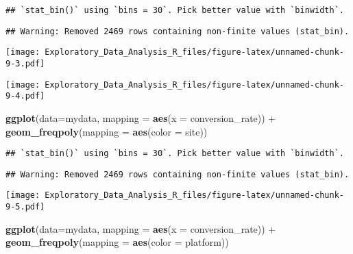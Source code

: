 \documentclass[]{article}
\newenvironment{Shaded}{\begin{snugshade}}{\end{snugshade}}
\newcommand{\KeywordTok}[1]{\textcolor[rgb]{0.13,0.29,0.53}{\textbf{{#1}}}}
\newcommand{\DataTypeTok}[1]{\textcolor[rgb]{0.13,0.29,0.53}{{#1}}}
\newcommand{\StringTok}[1]{\textcolor[rgb]{0.31,0.60,0.02}{{#1}}}
\newcommand{\OtherTok}[1]{\textcolor[rgb]{0.56,0.35,0.01}{{#1}}}
\newcommand{\NormalTok}[1]{{#1}}
\begin{document}
\begin{verbatim}
## `stat_bin()` using `bins = 30`. Pick better value with `binwidth`.
\end{verbatim}

\begin{verbatim}
## Warning: Removed 2469 rows containing non-finite values (stat_bin).
\end{verbatim}

\texttt{[image: Exploratory\_Data\_Analysis\_R\_files/figure-latex/unnamed-chunk-9-3.pdf]}

\begin{Shaded}
\end{Shaded}

\texttt{[image: Exploratory\_Data\_Analysis\_R\_files/figure-latex/unnamed-chunk-9-4.pdf]}

\begin{Shaded}
\begin{Highlighting}[]
\KeywordTok{ggplot}\NormalTok{(}\DataTypeTok{data=}\NormalTok{mydata, }\DataTypeTok{mapping =} \KeywordTok{aes}\NormalTok{(}\DataTypeTok{x =} \NormalTok{conversion_rate)) +}
\StringTok{  }\KeywordTok{geom_freqpoly}\NormalTok{(}\DataTypeTok{mapping =} \KeywordTok{aes}\NormalTok{(}\DataTypeTok{color =} \NormalTok{site))}
\end{Highlighting}
\end{Shaded}

\begin{verbatim}
## `stat_bin()` using `bins = 30`. Pick better value with `binwidth`.
\end{verbatim}

\begin{verbatim}
## Warning: Removed 2469 rows containing non-finite values (stat_bin).
\end{verbatim}

\texttt{[image: Exploratory\_Data\_Analysis\_R\_files/figure-latex/unnamed-chunk-9-5.pdf]}

\begin{Shaded}
\begin{Highlighting}[]
\KeywordTok{ggplot}\NormalTok{(}\DataTypeTok{data=}\NormalTok{mydata, }\DataTypeTok{mapping =} \KeywordTok{aes}\NormalTok{(}\DataTypeTok{x =} \NormalTok{conversion_rate)) +}
\StringTok{  }\KeywordTok{geom_freqpoly}\NormalTok{(}\DataTypeTok{mapping =} \KeywordTok{aes}\NormalTok{(}\DataTypeTok{color =} \NormalTok{platform))}
\end{Highlighting}
\end{Shaded}
\end{document}
